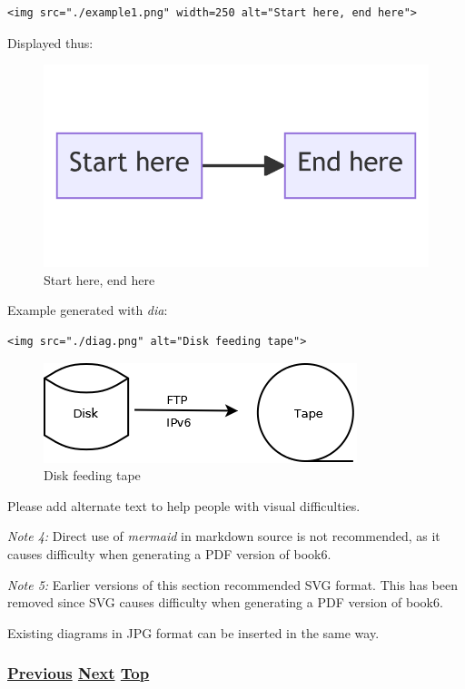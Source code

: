 \documentclass[
]{article}
\begin{document}
\begin{verbatim}
<img src="./example1.png" width=250 alt="Start here, end here">
\end{verbatim}

Displayed thus:

\begin{figure}
\centering
\includegraphics{example1.png}
\caption{Start here, end here}
\end{figure}

Example generated with \emph{dia}:

\begin{verbatim}
<img src="./diag.png" alt="Disk feeding tape">
\end{verbatim}

\begin{figure}
\centering
\includegraphics{diag.png}
\caption{Disk feeding tape}
\end{figure}

Please add alternate text to help people with visual difficulties.

\emph{Note 4:} Direct use of \emph{mermaid} in markdown source is not
recommended, as it causes difficulty when generating a PDF version of
book6.

\emph{Note 5:} Earlier versions of this section recommended SVG format.
This has been removed since SVG causes difficulty when generating a PDF
version of book6.

Existing diagrams in JPG format can be inserted in the same way.

\subsubsection{\texorpdfstring{\hyperref[section-template]{Previous}
\hyperref[last-section]{Next}
\hyperref[chapter-template]{Top}}{Previous Next Top}}\label{previous-next-top-40}
\end{document}
